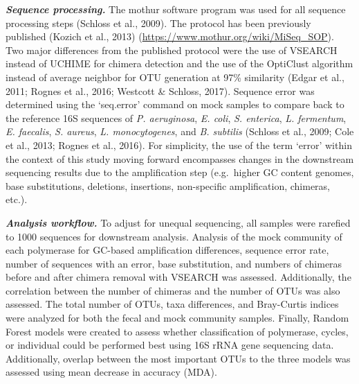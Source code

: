 \documentclass[11pt,]{article}
\begin{document}
\textbf{\emph{Sequence processing.}} The mothur software program was
used for all sequence processing steps (Schloss et al., 2009). The
protocol has been previously published (Kozich et al., 2013)
(\url{https://www.mothur.org/wiki/MiSeq_SOP}). Two major differences
from the published protocol were the use of VSEARCH instead of UCHIME
for chimera detection and the use of the OptiClust algorithm instead of
average neighbor for OTU generation at 97\% similarity (Edgar et al.,
2011; Rognes et al., 2016; Westcott \& Schloss, 2017). Sequence error
was determined using the `seq.error' command on mock samples to compare
back to the reference 16S sequences of \emph{P. aeruginosa}, \emph{E.
coli}, \emph{S. enterica}, \emph{L. fermentum}, \emph{E. faecalis},
\emph{S. aureus}, \emph{L. monocytogenes}, and \emph{B. subtilis}
(Schloss et al., 2009; Cole et al., 2013; Rognes et al., 2016). For
simplicity, the use of the term `error' within the context of this study
moving forward encompasses changes in the downstream sequencing results
due to the amplification step (e.g.~higher GC content genomes, base
substitutions, deletions, insertions, non-specific amplification,
chimeras, etc.).

\textbf{\emph{Analysis workflow.}} To adjust for unequal sequencing, all
samples were rarefied to 1000 sequences for downstream analysis.
Analysis of the mock community of each polymerase for GC-based
amplification differences, sequence error rate, number of sequences with
an error, base substitution, and numbers of chimeras before and after
chimera removal with VSEARCH was assessed. Additionally, the correlation
between the number of chimeras and the number of OTUs was also assessed.
The total number of OTUs, taxa differences, and Bray-Curtis indices were
analyzed for both the fecal and mock community samples. Finally, Random
Forest models were created to assess whether classification of
polymerase, cycles, or individual could be performed best using 16S rRNA
gene sequencing data. Additionally, overlap between the most important
OTUs to the three models was assessed using mean decrease in accuracy
(MDA).
\end{document}
